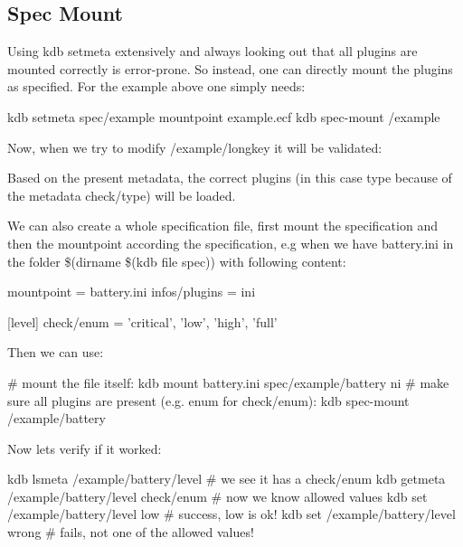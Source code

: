 \subsection*{Spec Mount}

Using {\ttfamily kdb setmeta} extensively and always looking out that all plugins are mounted correctly is error-\/prone. So instead, one can directly mount the plugins as specified. For the example above one simply needs\+: \begin{DoxyVerb}    kdb setmeta spec/example mountpoint example.ecf
    kdb spec-mount /example
\end{DoxyVerb}


Now, when we try to modify {\ttfamily /example/longkey} it will be validated\+: 


Based on the present metadata, the correct plugins (in this case {\ttfamily type} because of the metadata {\ttfamily check/type}) will be loaded.

We can also create a whole specification file, first mount the specification and then the mountpoint according the specification, e.\+g when we have {\ttfamily battery.\+ini} in the folder {\ttfamily \$(dirname \$(kdb file spec))} with following content\+: \begin{DoxyVerb}    []
    mountpoint = battery.ini
    infos/plugins = ini

    [level]
    check/enum = 'critical', 'low', 'high', 'full'
\end{DoxyVerb}


Then we can use\+: \begin{DoxyVerb}    # mount the file itself:
    kdb mount battery.ini spec/example/battery ni
    # make sure all plugins are present (e.g. enum for check/enum):
    kdb spec-mount /example/battery
\end{DoxyVerb}


Now lets verify if it worked\+: \begin{DoxyVerb}    kdb lsmeta /example/battery/level
    # we see it has a check/enum
    kdb getmeta /example/battery/level check/enum
    # now we know allowed values
    kdb set /example/battery/level low
    # success, low is ok!
    kdb set /example/battery/level wrong
    # fails, not one of the allowed values!
\end{DoxyVerb}


